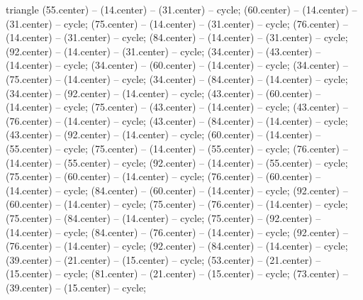 \begin{pgfonlayer}{triangle}
 (55.center) -- (14.center) -- (31.center) -- cycle; 
 (60.center) -- (14.center) -- (31.center) -- cycle; 
 (75.center) -- (14.center) -- (31.center) -- cycle; 
 (76.center) -- (14.center) -- (31.center) -- cycle; 
 (84.center) -- (14.center) -- (31.center) -- cycle; 
 (92.center) -- (14.center) -- (31.center) -- cycle; 
 (34.center) -- (43.center) -- (14.center) -- cycle; 
 (34.center) -- (60.center) -- (14.center) -- cycle; 
 (34.center) -- (75.center) -- (14.center) -- cycle; 
 (34.center) -- (84.center) -- (14.center) -- cycle; 
 (34.center) -- (92.center) -- (14.center) -- cycle; 
 (43.center) -- (60.center) -- (14.center) -- cycle; 
 (75.center) -- (43.center) -- (14.center) -- cycle; 
 (43.center) -- (76.center) -- (14.center) -- cycle; 
 (43.center) -- (84.center) -- (14.center) -- cycle; 
 (43.center) -- (92.center) -- (14.center) -- cycle; 
 (60.center) -- (14.center) -- (55.center) -- cycle; 
 (75.center) -- (14.center) -- (55.center) -- cycle; 
 (76.center) -- (14.center) -- (55.center) -- cycle; 
 (92.center) -- (14.center) -- (55.center) -- cycle; 
 (75.center) -- (60.center) -- (14.center) -- cycle; 
 (76.center) -- (60.center) -- (14.center) -- cycle; 
 (84.center) -- (60.center) -- (14.center) -- cycle; 
 (92.center) -- (60.center) -- (14.center) -- cycle; 
 (75.center) -- (76.center) -- (14.center) -- cycle; 
 (75.center) -- (84.center) -- (14.center) -- cycle; 
 (75.center) -- (92.center) -- (14.center) -- cycle; 
 (84.center) -- (76.center) -- (14.center) -- cycle; 
 (92.center) -- (76.center) -- (14.center) -- cycle; 
 (92.center) -- (84.center) -- (14.center) -- cycle; 
 (39.center) -- (21.center) -- (15.center) -- cycle; 
 (53.center) -- (21.center) -- (15.center) -- cycle; 
 (81.center) -- (21.center) -- (15.center) -- cycle; 
 (73.center) -- (39.center) -- (15.center) -- cycle; 

\end{pgfonlayer}

